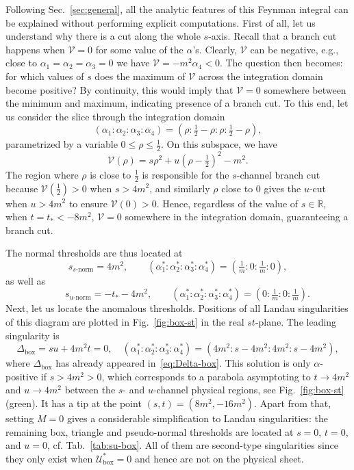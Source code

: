 \documentclass[12pt]{article}
\numberwithin{figure}{section}
\def \be {\begin{equation}}
\def \ee {\end{equation}}
\def \R {\mathbb{R}}
\def \U {\mathcal{U}}
\def \V {\mathcal{V}}
\def \leq {\leqslant}
\def \boxx {\mathrm{box}}
\begin{document}
	Following Sec.~\ref{sec:general}, all the analytic features of this Feynman integral can be explained without performing explicit computations. First of all, let us understand why there is a cut along the whole $s$-axis. Recall that a branch cut happens when $\V=0$ for some value of the $\alpha$'s. Clearly, $\V$ can be negative, e.g., close to $\alpha_1 = \alpha_2 = \alpha_3 = 0$ we have $\V = -m^2 \alpha_4 < 0$. The question then becomes: for which values of $s$ does the maximum of $\V$ across the integration domain become positive? By continuity, this would imply that $\V=0$ somewhere between the minimum and maximum, indicating presence of a branch cut. To this end, let us consider the slice through the integration domain
	\be
	(\alpha_1 : \alpha_2 : \alpha_3 : \alpha_4) = (\rho : \tfrac{1}{2} {-}\rho : \rho : \tfrac{1}{2}{-}\rho),
	\ee
	parametrized by a variable $0 \leq \rho \leq \tfrac{1}{2}$. On this subspace, we have
	\be
	\V(\rho) = s \rho^2 + u \left(\rho - \tfrac{1}{2}\right)^2 - m^2.
	\ee
	The region where $\rho$ is close to $\tfrac{1}{2}$ is responsible for the $s$-channel branch cut because $\V(\tfrac{1}{2}) > 0$ when $s>4m^2$, and similarly $\rho$ close to $0$ gives the $u$-cut when $u>4m^2$ to ensure $\V(0) > 0$. Hence, regardless of the value of $s \in \R$, when $t = t_\ast < -8m^2$, $\V=0$ somewhere in the integration domain, guaranteeing a branch cut.
	
	
	The normal thresholds are thus located at
	\be
	s_{s\text{-norm}} = 4m^2, \qquad (\alpha_1^\ast : \alpha_2^\ast : \alpha_3^\ast : \alpha_4^\ast ) = (\tfrac{1}{m}: 0 : \tfrac{1}{m} : 0),
	\ee
	as well as
	\be
	\qquad s_{u\text{-norm}} = - t_\ast - 4m^2, \qquad (\alpha_1^\ast : \alpha_2^\ast : \alpha_3^\ast : \alpha_4^\ast ) = ( 0 : \tfrac{1}{m}: 0 : \tfrac{1}{m}).
	\ee
	Next, let us locate the anomalous thresholds. Positions of all Landau singularities of this diagram are plotted in Fig.~\ref{fig:box-st} in the real $st$-plane. The leading singularity is
	\be
    \Delta_{\boxx} = su + 4m^2 t = 0, \quad (\alpha_1^\ast : \alpha_2^\ast : \alpha_3^\ast : \alpha_4^\ast ) = (4m^2 : s{-}4m^2 : 4m^2 : s{-}4m^2),
	\ee
	where $\Delta_{\boxx}$ has already appeared in~\eqref{eq:Delta-box}.
	This solution is only $\alpha$-positive if $s > 4m^2 > 0$, which corresponds to a parabola asymptoting to $t \to 4m^2$ and $u \to 4m^2$ between the $s$- and $u$-channel physical regions, see Fig.~\ref{fig:box-st} (green). It has a tip at the point $(s,t) = (8m^2, -16m^2)$. Apart from that, setting $M=0$ gives a considerable simplification to Landau singularities: the remaining box, triangle and pseudo-normal thresholds are located at $s=0$, $t=0$, and $u=0$, cf. Tab.~\ref{tab:su-box}. All of them are second-type singularities since they only exist when $\U_{\boxx}^\ast = 0$ and hence are not on the physical sheet.
	
\end{document}
